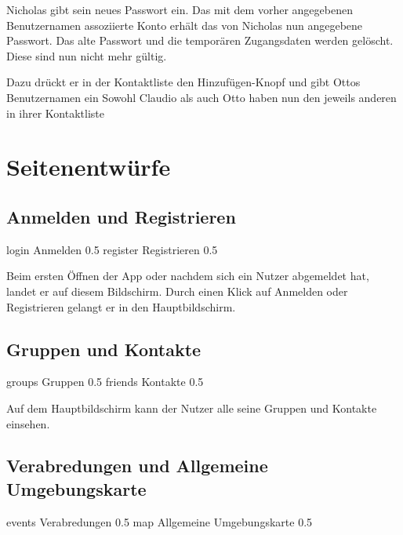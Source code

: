 \documentclass[parskip=full,11pt]{scrartcl}
\begin{document}
{Nicholas gibt sein neues Passwort ein.}
{Das mit dem vorher angegebenen Benutzernamen assoziierte Konto erhält das von
Nicholas nun angegebene Passwort.
Das alte Passwort und die temporären Zugangsdaten werden gelöscht.
Diese sind nun nicht mehr gültig.}


{Dazu drückt er in der Kontaktliste den Hinzufügen-Knopf und gibt Ottos Benutzernamen ein}
{Sowohl Claudio als auch Otto haben nun den jeweils anderen in ihrer Kontaktliste}


\pagebreak
\appendix

\section{Seitenentwürfe}

\subsection{Anmelden und Registrieren}
{login}
{Anmelden}
{0.5}
{register}
{Registrieren}
{0.5}

Beim ersten Öffnen der App oder nachdem sich ein Nutzer abgemeldet hat, landet er auf diesem Bildschirm.
Durch einen Klick auf Anmelden oder Registrieren gelangt er in den Hauptbildschirm.

\pagebreak
\subsection{Gruppen und Kontakte}
{groups}
{Gruppen}
{0.5}
{friends}
{Kontakte}
{0.5}

Auf dem Hauptbildschirm kann der Nutzer alle seine Gruppen und Kontakte einsehen.

\pagebreak
\subsection{Verabredungen und Allgemeine Umgebungskarte}
{events}
{Verabredungen}
{0.5}
{map}
{Allgemeine Umgebungskarte}
{0.5}
\end{document}
